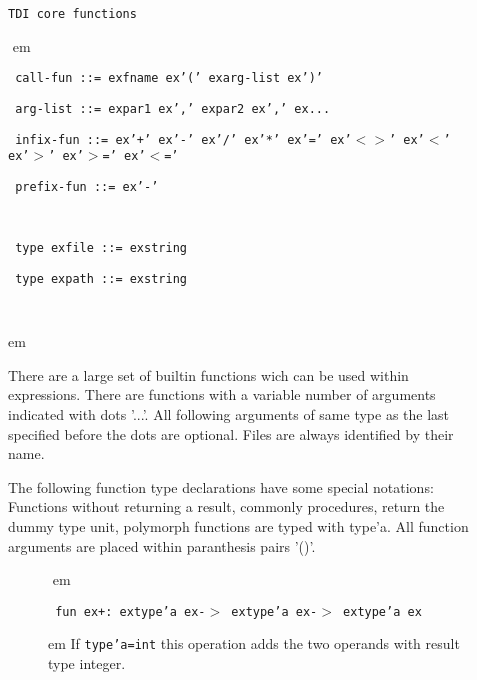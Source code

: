 \documentclass[a4paper,12pt,twoside,english]{article}
\def\s{\hskip 1.15 ex}
\begin{document}
\def\thesubsection{\tocCIV}
\secII{\label{toclabelCIV}\thesubsection}
\begin{description}
\item[] $ $\\
{\tt TDI core functions}

\item[]
\def\prefskipu{}\def\prefskipo{}\def\prefskipa{}\def\prefskipu{\hskip10pt}\def\prefskipo{\hskip10pt}\def\prefskipa{\hskip20pt}\def\content{
\vskip-5pt{\parindent0pt\parbox{\linewidth}{\tt\smallsize\hskip10pt call-fun~::=\s fname\s '('\s arg-list\s ')'}}
\vskip-5pt{\parindent0pt\parbox{\linewidth}{\tt\smallsize\hskip10pt arg-list~::=\s par1\s ','\s par2\s ','\s ...}}
\vskip-5pt{\parindent0pt\parbox{\linewidth}{\tt\smallsize\hskip10pt infix-fun~::=\s '+'\s '-'\s '/'\s '*'\s '='\s '$<$$>$'\s '$<$'\s '$>$'\s '$>$='\s '$<$='}}
\vskip-5pt{\parindent0pt\parbox{\linewidth}{\tt\smallsize\hskip10pt prefix-fun~::=\s '-'}}
\vskip-5pt{\parindent0pt\parbox{\linewidth}{\tt\smallsize\hskip10pt }}
\vskip-5pt{\parindent0pt\parbox{\linewidth}{\tt\smallsize\hskip10pt type\s file~::=\s string}}
\vskip-5pt{\parindent0pt\parbox{\linewidth}{\tt\smallsize\hskip10pt type\s path~::=\s string}}
\vskip-5pt{\parindent0pt\parbox{\linewidth}{\tt\smallsize\hskip10pt }}
}
$ $
 em
\content
{} em
\item[] $ $\\
There are a large set of builtin functions wich can be used within expressions. There are functions  with a variable number of arguments indicated with dots
'...'. All following arguments of same type as the last specified before the dots are optional. Files are always identified by their name. 

The following function type declarations have some special notations: Functions without returning a result, commonly procedures,  return the dummy type unit, 
polymorph functions are typed with type'a. All function arguments are placed within paranthesis pairs '()'.


\begin{description}
\item[]
\def\prefskipu{}\def\prefskipo{}\def\prefskipa{}\def\prefskipu{\hskip10pt}\def\prefskipo{\hskip10pt}\def\prefskipa{\hskip30pt}\def\content{
\vskip-5pt{\parindent0pt\parbox{\linewidth}{\tt\smallsize\hskip10pt fun\s +:\s type'a\s -$>$\s type'a\s -$>$\s type'a\s }}
}
$ $
 em
\content
{} em
If {\tt type'a=int} this operation adds the two operands with result type integer.


\end{description}
\end{description}
\end{document}
